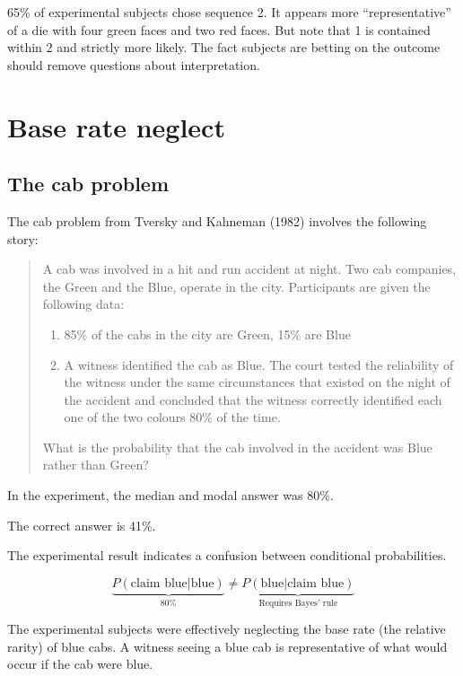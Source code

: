 \documentclass[
  letterpaper,
  DIV=11,
  numbers=noendperiod]{scrreprt}
\begin{document}
65\% of experimental subjects chose sequence 2. It appears more
``representative'' of a die with four green faces and two red faces. But
note that 1 is contained within 2 and strictly more likely. The fact
subjects are betting on the outcome should remove questions about
interpretation.

\hypertarget{base-rate-neglect}{%
\section{Base rate neglect}\label{base-rate-neglect}}

\hypertarget{the-cab-problem}{%
\subsection{The cab problem}\label{the-cab-problem}}

The cab problem from Tversky and Kahneman (1982) involves the following
story:

\begin{quote}
A cab was involved in a hit and run accident at night. Two cab
companies, the Green and the Blue, operate in the city. Participants are
given the following data:

\begin{enumerate}
\def\labelenumi{\arabic{enumi}.}
\item
  85\% of the cabs in the city are Green, 15\% are Blue
\item
  A witness identified the cab as Blue. The court tested the reliability
  of the witness under the same circumstances that existed on the night
  of the accident and concluded that the witness correctly identified
  each one of the two colours 80\% of the time.
\end{enumerate}

What is the probability that the cab involved in the accident was Blue
rather than Green?
\end{quote}

In the experiment, the median and modal answer was 80\%.

The correct answer is 41\%.

The experimental result indicates a confusion between conditional
probabilities.

\[
\underbrace{P(\text{claim blue}|\text{blue})}_{80\%}\neq \underbrace{P(\text{blue}|\text{claim blue})}_{\text{Requires Bayes' rule}}
\]

The experimental subjects were effectively neglecting the base rate (the
relative rarity) of blue cabs. A witness seeing a blue cab is
representative of what would occur if the cab were blue.
\end{document}
